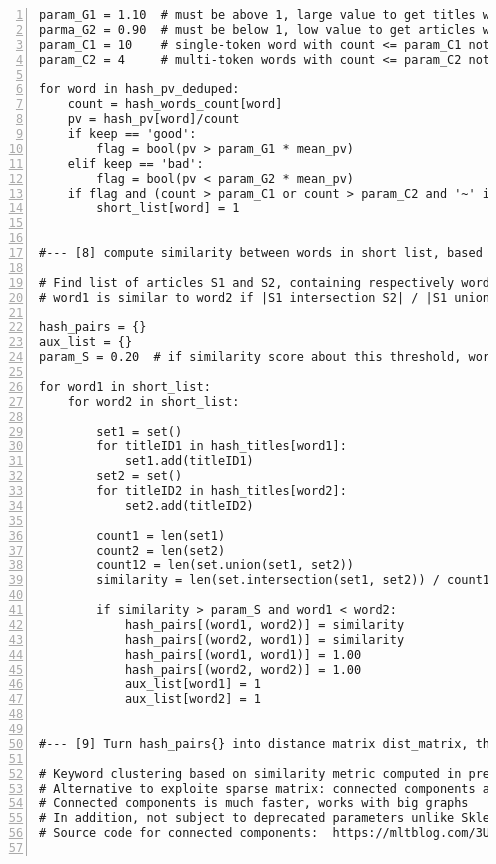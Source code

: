 \documentclass[oneside,10pt]{book}
\begin{document}
\begin{lstlisting}[numbers=left]
param_G1 = 1.10  # must be above 1, large value to get titles with highest pv
parma_G2 = 0.90  # must be below 1, low value to get articles with lowest pv
param_C1 = 10    # single-token word with count <= param_C1 not included in short_list
param_C2 = 4     # multi-token words with count <= param_C2 not included in short_list

for word in hash_pv_deduped: 
    count = hash_words_count[word]
    pv = hash_pv[word]/count
    if keep == 'good':
        flag = bool(pv > param_G1 * mean_pv)
    elif keep == 'bad':
        flag = bool(pv < param_G2 * mean_pv)  
    if flag and (count > param_C1 or count > param_C2 and '~' in word): 
        short_list[word] = 1


#--- [8] compute similarity between words in short list, based on common titles

# Find list of articles S1 and S2, containing respectively word1 and word2
# word1 is similar to word2 if |S1 intersection S2| / |S1 union S2| is high

hash_pairs = {}
aux_list = {}
param_S = 0.20  # if similarity score about this threshold, word1 and word2 are linked

for word1 in short_list:
    for word2 in short_list:

        set1 = set()
        for titleID1 in hash_titles[word1]:
            set1.add(titleID1)
        set2 = set()
        for titleID2 in hash_titles[word2]:
            set2.add(titleID2)

        count1 = len(set1)
        count2 = len(set2)
        count12 = len(set.union(set1, set2))
        similarity = len(set.intersection(set1, set2)) / count12

        if similarity > param_S and word1 < word2: 
            hash_pairs[(word1, word2)] = similarity
            hash_pairs[(word2, word1)] = similarity
            hash_pairs[(word1, word1)] = 1.00
            hash_pairs[(word2, word2)] = 1.00
            aux_list[word1] = 1
            aux_list[word2] = 1 


#--- [9] Turn hash_pairs{} into distance matrix dist_matrix, then perform clustering

# Keyword clustering based on similarity metric computed in previous step 
# Alternative to exploite sparse matrix: connected components algorithm on hash_pairs
# Connected components is much faster, works with big graphs
# In addition, not subject to deprecated parameters unlike Sklearn clustering
# Source code for connected components:  https://mltblog.com/3UDJ2tR  


\end{lstlisting}
\end{document}
